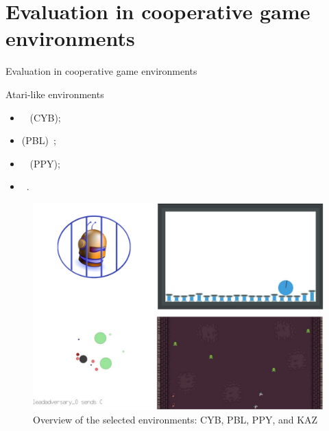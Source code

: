 

\section{Evaluation in cooperative game environments}

\begin{frame}{Evaluation in cooperative game environments}

    \begin{block}{Atari-like environments}

        \begin{minipage}{0.5\textwidth}
            \centering
            \begin{itemize}
                \item {}~\cite{cage_challenge_3_announcement} (CYB);
                \item {} (PBL)~\cite{Terry2021};
                \item {}~\cite{Lowe2017} (PPY);
                \item {}~\cite{Terry2021}.
            \end{itemize}
        \end{minipage}\hfill
        \begin{minipage}{0.5\textwidth}
            \centering
            \begin{figure}[H]
                \centering
                \includegraphics[width=0.5\linewidth]{figures/envs_4x4.png}
                \caption*{Overview of the selected environments: CYB, PBL, PPY, and KAZ}
                \label{fig:simulated_environments}
            \end{figure}
        \end{minipage}\hfill


\end{block}
\end{frame}
